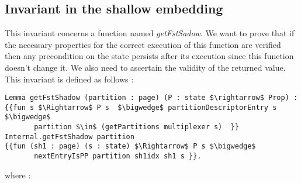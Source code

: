 \subsection{Invariant in the shallow embedding} \label{getFstInv}
This invariant concerns a function named \textit{getFstSadow}. We want to prove that if the necessary properties for the correct execution of this function are verified then any precondition on the state persists after its execution since this function doesn't change it. We also need to ascertain the validity of the returned value. This invariant is defined as follows :  
\begin{lstlisting}[caption = {getFstShadow invariant in the shallow embedding}, xleftmargin=-.02\textwidth,
xrightmargin=-.02\textwidth,mathescape=true]
Lemma getFstShadow (partition : page) (P : state $\rightarrow$ Prop) :
{{fun s $\Rightarrow$ P s  $\bigwedge$ partitionDescriptorEntry s $\bigwedge$ 
	   partition $\in$ (getPartitions multiplexer s)  }} 
Internal.getFstShadow partition
{{fun (sh1 : page) (s : state) $\Rightarrow$ P s $\bigwedge$ 
	   nextEntryIsPP partition sh1idx sh1 s }}.
\end{lstlisting}
where :
